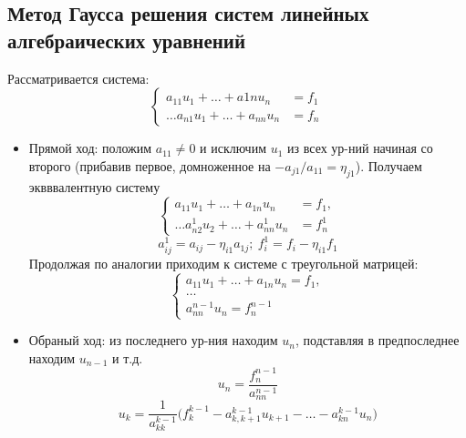 \documentclass[a4paper]{article}
\begin{document}
\subsection{Метод Гаусса решения систем линейных алгебраических уравнений}
Рассматривается система:
$$
\begin{cases}
	a_{11}u_1 + \ldots + a{1n}u_n &= f_1 \\
	\ldots
	a_{n1}u_1 + \ldots + a_{nn}u_n &= f_n 
\end{cases} $$
\begin{itemize}
	\item Прямой ход: положим $a_{11} \neq 0$ и исключим $u_1$ из всех ур-ний начиная со второго (прибавив первое, домноженное на $-a_{j1}/a_{11} = \eta_{j1}$). Получаем эквввалентную систему
	$$\begin{cases}
		a_{11}u_1 + \ldots + a_{1n}u_n &= f_1,\\
		\ldots
		a_{n2}^1 u_2 + \ldots + a_{nn}^1u_n &= f_n^1
	\end{cases}$$ 
	$$
	a_{ij}^1 = a_{ij} - \eta_{i1}a_{1j} ; \ f_i^1 = f_i - \eta_{i1}f_1
	$$
Продолжая по аналогии приходим к системе с треугольной матрицей:
$$\begin{cases}
		a_{11}u_1 + \ldots + a_{1n}u_n = f_1,\\
		\ldots \\
		a_{nn}^{n-1} u_n = f_n^{n-1}
	\end{cases}$$
	\item Обраный ход: из последнего ур-ния находим $u_n$, подставляя в предпоследнее находим $u_{n-1}$ и т.д.
	$$u_n = \frac{f_n^{n-1}}{a_{nn}^{n-1}} $$
	$$u_k = \frac{1}{a_{kk}^{k-1}} \big( f_k^{k-1} - a_{k,k+1}^{k-1}u_{k+1} - \ldots - a_{kn}^{k-1}u_n \big) $$ 
\end{itemize}
\end{document}
